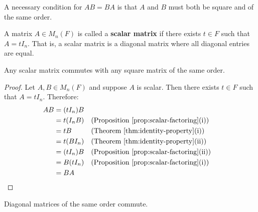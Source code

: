 \begin{note}
    A necessary condition for $AB = BA$ is that $A$ and $B$ must both be square and of the same order.
\end{note}

\begin{definition}\label{def:scalar-matrix}
    A matrix $A \in M_n(F)$ is called a \textbf{scalar matrix} if there exists $t \in F$ such that $A = tI_n$. That is, a scalar matrix is a diagonal matrix where all diagonal entries are equal.
\end{definition}

\begin{result}\label{rslt:scalar-commute}
    Any scalar matrix commutes with any square matrix of the same order.
\end{result}

\begin{proof}
    Let $A, B \in M_n(F)$ and suppose $A$ is scalar. Then there exists $t \in F$ such that $A = tI_n$. Therefore:
    \begin{align*}
    AB &= (tI_n)B \\
    &= t(I_nB) && \text{(Proposition~\ref{prop:scalar-factoring}(i))} \\
    &= tB && \text{(Theorem~\ref{thm:identity-property}(i))} \\
    &= t(BI_n) && \text{(Theorem~\ref{thm:identity-property}(ii))} \\
    &= (tI_n)B && \text{(Proposition~\ref{prop:scalar-factoring}(ii))} \\
    &= B(tI_n) && \text{(Proposition~\ref{prop:scalar-factoring}(i))} \\
    &= BA
    \end{align*}
\end{proof}

\begin{theorem}\label{thm:diagonal-commute}
    Diagonal matrices of the same order commute.
\end{theorem}

